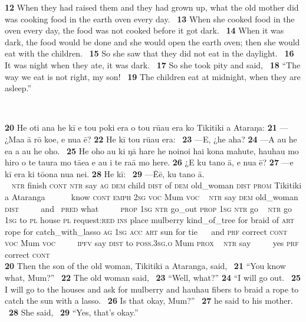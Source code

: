 \medskip\glt
\textbf{\textup{12}} When they had raised them and they had grown up, what the old mother did was cooking food in the earth oven every day. ~\textbf{\textup{13}} When she cooked food in the oven every day, the food was not cooked before it got dark. ~\textbf{\textup{14}} When it was dark, the food would be done and she would open the earth oven; then she would eat with the children. ~\textbf{\textup{15}} So she saw that they did not eat in the daylight. ~\textbf{\textup{16}} It was night when they ate, it was dark. ~\textbf{\textup{17}} So she took pity and said, ~\textbf{\textup{18}} “The way we eat is not right, my son! ~\textbf{\textup{19}} The children eat at midnight, when they are asleep.”


~

\bigskip\gll
\textbf{\textup{20}} He oti {\ꞌ}ana he kī e tou poki era o tou rū{\ꞌ}au era ko Tikitiki {\ꞌ}a {\ꞌ}Ataraŋa: \textbf{\textup{21}} —¿Ma{\ꞌ}a {\ꞌ}ā rō koe, e nua ē? \textbf{\textup{22}} He kī tou rū{\ꞌ}au era: ~\textbf{\textup{23}} —{\ꞌ}E, ¿he aha? \textbf{\textup{24}} —A au he e{\ꞌ}a a au he oho. ~\textbf{\textup{25}} He oho au ki ŋā hare he no{\ꞌ}ino{\ꞌ}i hai kona mahute, hauhau mo hiro o te taura mo tāea e au i te ra{\ꞌ}ā mo here. \textbf{\textup{26}} ¿{\ꞌ}E ku tano {\ꞌ}ā, e nua ē? \textbf{\textup{27}} —e kī era ki tō{\ꞌ}ona nua nei. \textbf{\textup{28}} He kī: ~\textbf{\textup{29}} —{\ꞌ}\=Eē, ku tano {\ꞌ}ā.\\
~ \textsc{ntr} finish \textsc{cont} \textsc{ntr} say \textsc{ag} \textsc{dem} child \textsc{dist} of \textsc{dem} old\_woman \textsc{dist} \textsc{prom} Tikitiki a Ataranga ~ ~~~~know \textsc{cont} \textsc{emph} \textsc{2sg} \textsc{voc} Mum \textsc{voc}  ~ \textsc{ntr} say \textsc{dem} old\_woman \textsc{dist} ~ ~~~and ~\textsc{pred} what ~ ~~~\textsc{prop} \textsc{1sg} \textsc{ntr} go\_out \textsc{prop} \textsc{1sg} \textsc{ntr} go ~ \textsc{ntr} go \textsc{1sg} to \textsc{pl} house \textsc{pl} request:\textsc{red} \textsc{ins} place mulberry kind\_of\_tree for braid of \textsc{art} rope for catch\_with\_lasso \textsc{ag} \textsc{1sg} \textsc{acc} \textsc{art} sun for tie ~ ~and \textsc{prf} correct \textsc{cont} \textsc{voc} Mum \textsc{voc} ~ ~~~\textsc{ipfv} say \textsc{dist} to \textsc{poss.3sg.o} Mum \textsc{prox} ~ \textsc{ntr} say ~ ~~~yes \textsc{prf} correct \textsc{cont}\\

\medskip\glt
\textbf{\textup{20}} Then the son of the old woman, Tikitiki a Ataranga, said, ~\textbf{\textup{21}} “You know what, Mum?” ~\textbf{\textup{22}} The old woman said, ~\textbf{\textup{23}} “Well, what?” \textbf{\textup{24}} “I will go out. ~\textbf{\textup{25}} I will go to the houses and ask for mulberry and hauhau fibers to braid a rope to catch the sun with a lasso. ~\textbf{\textup{26}} Is that okay, Mum?” ~\textbf{\textup{27}} he said to his mother. ~\textbf{\textup{28}} She said, ~\textbf{\textup{29}} “Yes, that’s okay.”

